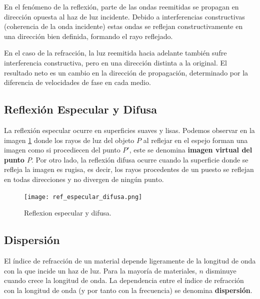 En el fenómeno de la reflexión, parte de las ondas reemitidas se propagan en dirección opuesta al haz de luz incidente. Debido a interferencias constructivas (coherencia de la onda incidente) estas ondas se reflejan constructivamente en una dirección bien definida, formando el rayo reflejado. 

En el caso de la refracción, la luz reemitida hacia adelante también sufre interferencia constructiva, pero en una dirección distinta a la original. El resultado neto es un cambio en la dirección de propagación, determinado por la diferencia de velocidades de fase en cada medio.




\subsection*{Reflexión Especular y Difusa}

La reflexión especular ocurre en superficies suaves y lisas. Podemos observar en la imagen \ref{fig:ref_especular_difusa} donde los rayos de luz del objeto $P$ al reflejar en el espejo forman una imagen como si procediecen del punto $P'$, este se denomina \textbf{imagen virtual del punto $P$}.
Por otro lado, la reflexión difusa ocurre cuando la superficie donde se refleja la imagen es rugisa, es decir, los rayos procedentes de un puesto se reflejan en todas direcciones y no divergen de ningún punto. 

\begin{figure}[H]
	\centering
	\texttt{[image: ref\_especular\_difusa.png]}
	\caption{Reflexion especular y difusa.}
	\label{fig:ref_especular_difusa}
\end{figure}


\subsection*{Dispersión}

El índice de refracción de un material depende ligeramente de la longitud de onda con la que incide un haz de luz. Para la mayoría de materiales, $n$ disminuye cuando crece la longitud de onda. La dependencia entre el índice de refracción con la longitud de onda (y por tanto con la frecuencia) se denomina \textbf{dispersión}.

